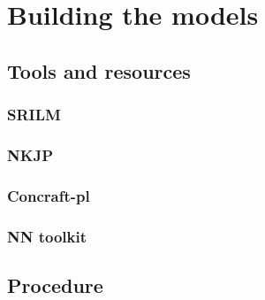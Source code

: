 \chapter{Building the models}
\label{chapter:tools}
\section{Tools and resources}
\subsection{SRILM}
\subsection{NKJP}
\label{section:nkjp}
\subsection{Concraft-pl}
\subsection{NN toolkit}
\section{Procedure}




